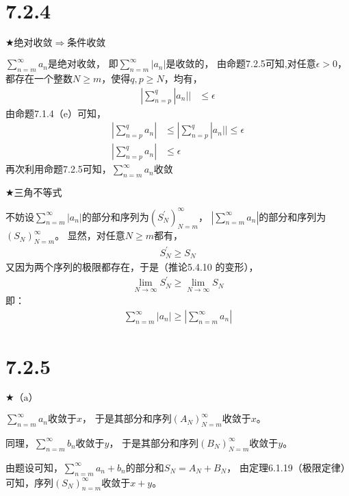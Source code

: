 \documentclass{article}
\theoremstyle{mystyle}
\begin{document}
\section*{7.2.4}

$\bigstar \text{绝对收敛} \Rightarrow \text{条件收敛}$

$\sum \limits_{n=m} ^{\infty} a_n$是绝对收敛，
即$\sum \limits_{n=m} ^{\infty} |a_n|$是收敛的，
由命题7.2.5可知,对任意$\epsilon > 0$，都存在一个整数$N \geq m$，使得$q,p \geq N$，均有，
\begin{align*}
  |\sum \limits_{n=p}^q |a_n|| & \leq \epsilon
\end{align*}
由命题7.1.4（e）可知，
\begin{align*}
  |\sum \limits_{n=p}^q a_n| & \leq |\sum \limits_{n=p}^q |a_n|| \leq \epsilon \\
  |\sum \limits_{n=p}^q a_n| & \leq \epsilon
\end{align*}
再次利用命题7.2.5可知，$\sum \limits_{n=m} ^{\infty} a_n$收敛

$\bigstar \text{三角不等式}$

不妨设$\sum \limits_{n=m} ^{\infty} |a_n|$的部分和序列为$(S_N^\prime)_{N=m}^{\infty}$，
$|\sum \limits_{n=m} ^{\infty} a_n|$的部分和序列为$(S_N)_{N=m}^{\infty}$。
显然，对任意$N \geq m$都有，
\begin{align*}
  S_N^\prime \geq S_N
\end{align*}
又因为两个序列的极限都存在，于是（推论5.4.10 的变形），
\begin{align*}
  \lim \limits_{N \rightarrow \infty} S_N^\prime
  \geq \lim \limits_{N \rightarrow \infty} S_N
\end{align*}
即：
\begin{align*}
  \sum \limits_{n=m} ^{\infty} |a_n| \geq |\sum \limits_{n=m} ^{\infty} a_n|
\end{align*}

\section*{7.2.5}

$\bigstar \text{（a）}$

$\sum \limits_{n=m} ^{\infty} a_n$收敛于$x$，
于是其部分和序列$(A_N)_{N=m}^{\infty}$收敛于$x$。

同理，$\sum \limits_{n=m} ^{\infty} b_n$收敛于$y$，
于是其部分和序列$(B_N)_{N=m}^{\infty}$收敛于$y$。

由题设可知，$\sum \limits_{n=m} ^{\infty} a_n + b_n$的部分和$S_N = A_N + B_N$，
由定理6.1.19（极限定律）可知，序列$(S_N)_{n=m}^\infty$收敛于$x + y$。
\end{document}

